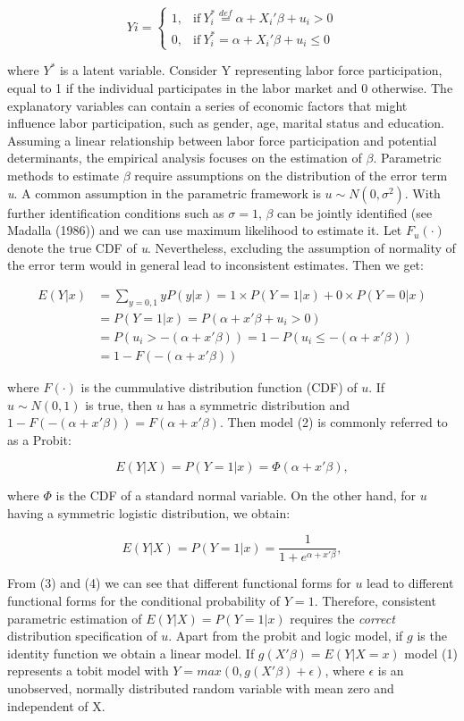 \documentclass[a4paper]{article}
\begin{document}
\[
    Yi = 
    \begin{cases}
      1, & \text{if}\ Y_i^* \stackrel{def}{=} \alpha + X_i'\beta + u_i > 0 \\
      0, & \text{if}\ Y_i^* = \alpha + X_i'\beta + u_i \leq 0
    \end{cases}
\]

where $Y^{*}$ is a latent variable.
Consider Y representing labor force participation, equal to 1 if the individual participates in the labor market and 0 otherwise. The explanatory variables can contain a series of economic factors that might influence labor participation, such as gender, age, marital status and education. Assuming a linear relationship between labor force participation and potential determinants, the empirical analysis focuses on the estimation of $\beta$.
Parametric methods to estimate $\beta$ require assumptions on the distribution of the error term \textit{u}. A common assumption in the parametric framework is $ u \sim N(0, \sigma^{2})$. With further identification conditions such as $\sigma = 1$, $\beta$ can be jointly identified (see Madalla (1986)) and we can use maximum likelihood to estimate it.  Let $F_u(\cdot)$ denote the true CDF of \textit{u}. Nevertheless, excluding the assumption of normality of the error term would in general lead to inconsistent estimates. Then we get:


\[ 
\begin{split}
E(Y|x) & = \sum_{y=0,1} yP(y|x) = 1 \times P(Y=1|x) + 0 \times P(Y=0|x) \\
 & = P(Y=1|x) = P(\alpha + x'\beta + u_i > 0) \\
 & = P(u_i > -(\alpha + x'\beta)) = 1 - P(u_i \leq -(\alpha + x'\beta)) \\
 & = 1 - F(-(\alpha + x'\beta))
\end{split}
\]

where $F(\cdot)$ is the cummulative distribution function (CDF) of $u$. If $ u \sim N(0,1)$ is true, then $u$ has a symmetric distribution and $1 - F(-(\alpha + x'\beta)) = F(\alpha + x'\beta)$. Then model (2) is commonly referred to as a Probit:

\[
E(Y|X) = P(Y=1|x) = \Phi(\alpha + x'\beta),
\]

where $\Phi$ is the CDF of a standard normal variable. On the other hand, for $u$ having a symmetric logistic distribution, we obtain:

\[
E(Y|X) = P(Y=1|x) = \frac{1}{1 + e^{\alpha + x'\beta}},
\]

From (3) and (4) we can see that different functional forms for $u$ lead to different functional forms for the conditional probability of $Y = 1$. Therefore, consistent parametric estimation of $E(Y|X) = P(Y=1|x)$ requires the \textit{correct} distribution specification of $u$. Apart from the probit and logic model, if $g$ is the identity function we obtain a linear model. If $g(X'\beta) = E(Y|X=x)$ model (1) represents a tobit model with $Y = max (0, g(X'\beta) + \epsilon)$, where $\epsilon$ is an unobserved, normally distributed random variable with mean zero and independent of X. 
\end{document}
